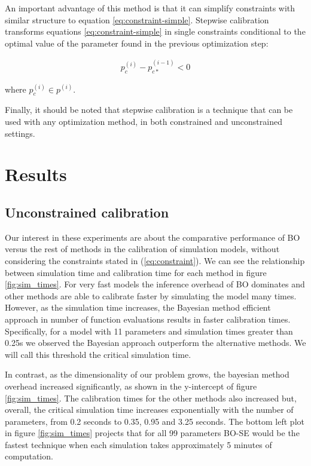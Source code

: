 \documentclass{IOS-Book-Article}
\begin{document}
 	An important advantage of this method is that it can simplify constraints with similar structure to equation \ref{eq:constraint-simple}. Stepwise calibration transforms equations \ref{eq:constraint-simple} in single constraints conditional to the optimal value of the parameter found in the previous optimization step:
 	
 	\begin{equation} \label{eq:stepwise-function}
 		\begin{aligned}
 			p_c^{(i)} - p_{c*}^{(i-1)} < 0
 		\end{aligned}
 	\end{equation}	
 
 	where $p_c^{(i)} \in p^{(i)}$.
 	
 	Finally, it should be noted that stepwise calibration is a technique that can be used with any optimization method, in both constrained and unconstrained settings.
 
	\section{Results}
	
	\subsection{Unconstrained calibration}
	\label{sec:results-unconstrained}
	Our interest in these experiments are about the comparative performance of BO versus the rest of methods in the calibration of simulation models, without considering the constraints stated in (\ref{eq:constraint}). We can see the relationship between simulation time and calibration time for each method in figure \ref{fig:sim_times}. For very fast models the inference overhead of BO dominates and other methods are able to calibrate faster by simulating the model many times. However, as the simulation time increases, the Bayesian method efficient approach in number of function evaluations results in faster calibration times. Specifically, for a model with 11 parameters and simulation times greater than 0.25s we observed the Bayesian approach outperform the alternative methods. We will call this threshold the critical simulation time.
	
	In contrast, as the dimensionality of our problem grows, the bayesian method overhead increased significantly, as shown in the y-intercept of figure \ref{fig:sim_times}. The calibration times for the other methods also increased but, overall, the critical simulation time increases exponentially with the number of parameters, from 0.2 seconds to 0.35, 0.95 and 3.25 seconds. The bottom left plot in figure \ref{fig:sim_times} projects that for all 99 parameters BO-SE would be the fastest technique when each simulation takes approximately 5 minutes of computation.
	
\end{document}

